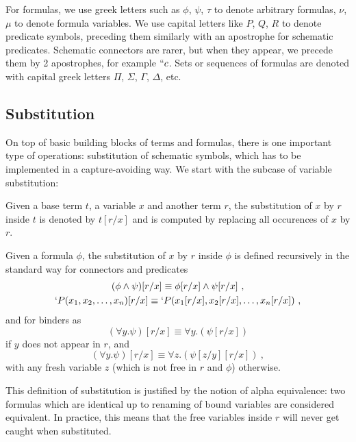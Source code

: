 For formulas, we use greek letters such as $\phi$, $\psi$, $\tau$ to denote arbitrary formulas, $\nu$, $\mu$ to denote formula variables. We use capital letters like $P$, $Q$, $R$ to denote predicate symbols, preceding them similarly with an apostrophe for schematic predicates. Schematic connectors are rarer, but when they appear, we precede them by 2 apostrophes, for example $``c$. Sets or sequences of formulas are denoted with capital greek letters $\Pi$, $\Sigma$, $\Gamma$, $\Delta$, etc.

\subsection{Substitution}
\label{subsec:substitution}
On top of basic building blocks of terms and formulas, there is one important type of operations: substitution of schematic symbols, which has to be implemented in a capture-avoiding way. We start with the subcase of variable substitution:
\begin{defin}
  Given a base term $t$, a variable $x$ and another term $r$, the substitution of $x$ by $r$ inside $t$ is denoted by $ t[r/x] $ and is computed by replacing all occurences of $x$ by $r$.

  Given a formula $\phi$, the substitution of $x$ by $r$ inside $\phi$ is defined recursively in the standard way for connectors and predicates
  \begin{gather*}
    (\phi \land \psi)[r/x] \equiv \phi[r/x] \land \psi[r/x]~,\\
    `P(x_1, x_2, \ldots, x_n)[r/x] \equiv `P(x_1[r/x], x_2[r/x], \ldots, x_n[r/x])~,
  \end{gather*}
  and for binders as
  $$
    (\forall y. \psi)[r/x] \equiv \forall y. (\psi[r/x])
  $$
  if $y$ does not appear in $r$, and
  $$
    (\forall y. \psi)[r/x] \equiv \forall z. (\psi[z/y][r/x])~,
  $$
  with any fresh variable $z$ (which is not free in $r$ and $\phi$) otherwise.
\end{defin}


This definition of substitution is justified by the notion of alpha equivalence: two formulas which are identical up to renaming of bound variables are considered equivalent. In practice, this means that the free variables inside $r$ will never get caught when substituted.

